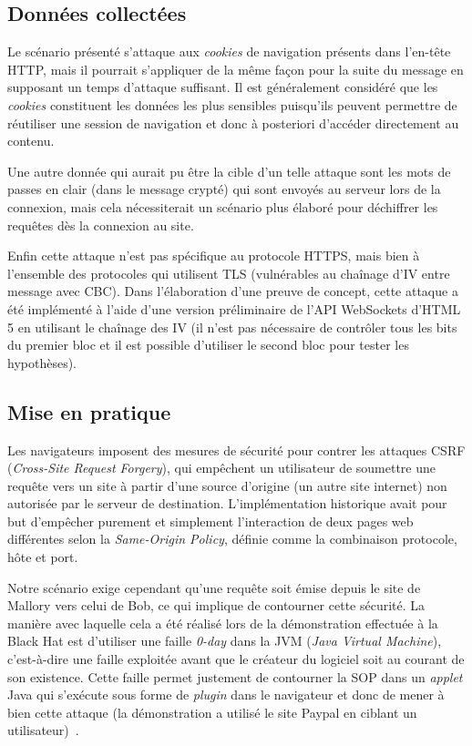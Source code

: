 \documentclass[a4paper,twoside]{article}
\begin{document}
\subsection{Données collectées}

Le scénario présenté s'attaque aux \emph{cookies} de navigation présents
dans l'en-tête HTTP, mais il pourrait s'appliquer de la même façon pour la
suite du message en supposant un temps d'attaque suffisant. Il est
généralement considéré que les \emph{cookies} constituent les données les
plus sensibles puisqu'ils peuvent permettre de réutiliser une session de
navigation et donc à posteriori d'accéder directement au contenu.

Une autre donnée qui aurait pu être la cible d'un telle attaque sont les
mots de passes en clair (dans le message crypté) qui sont envoyés au
serveur lors de la connexion, mais cela nécessiterait un scénario plus
élaboré pour déchiffrer les requêtes dès la connexion au site.

Enfin cette attaque n'est pas spécifique au protocole HTTPS, mais bien à
l'ensemble des protocoles qui utilisent TLS (vulnérables au chaînage d'IV
entre message avec CBC). Dans l'élaboration d'une preuve de concept, cette
attaque a été implémenté à l'aide d'une version préliminaire de l'API
WebSockets d'HTML 5 en utilisant le chaînage des IV (il n'est pas
nécessaire de contrôler tous les bits du premier bloc et il est possible
d'utiliser le second bloc pour tester les hypothèses).

\subsection{Mise en pratique}

Les navigateurs imposent des mesures de sécurité pour contrer les attaques
CSRF (\emph{Cross-Site Request Forgery}), qui empêchent un utilisateur de soumettre
une requête vers un site à partir d'une source d'origine (un autre site internet) non
autorisée par le serveur de destination. L'implémentation historique
avait pour but d'empêcher purement et simplement l'interaction de deux pages
web différentes selon la \emph{Same-Origin Policy}, définie comme la
combinaison protocole, hôte et port.

Notre scénario exige cependant qu'une requête soit émise depuis le site de
Mallory vers celui de Bob, ce qui implique de contourner cette sécurité. La
manière avec laquelle cela a été réalisé lors de la démonstration effectuée
à la Black Hat est d'utiliser une faille \emph{0-day} dans la JVM
(\emph{Java Virtual Machine}), c'est-à-dire une faille exploitée avant que
le créateur du logiciel soit au courant de son existence. Cette faille
permet justement de contourner la SOP dans un \emph{applet} Java qui
s'exécute sous forme de \emph{plugin} dans le navigateur et donc de mener à
bien cette attaque (la démonstration a utilisé le site Paypal en ciblant un
utilisateur)~\cite{Thai:BEAST}.
\end{document}
